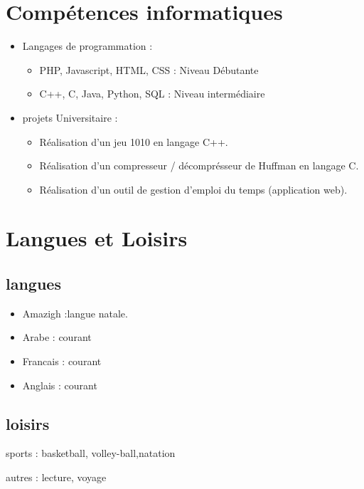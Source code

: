 \documentclass[a4paper]{article}
\begin{document}
\section{Compétences informatiques}
    \begin{itemize}
        \item Langages de programmation :
        \begin{itemize}
            \item PHP, Javascript, HTML, CSS : Niveau Débutante
            \item C++, C, Java, Python, SQL : Niveau intermédiaire 
        \end{itemize}
        
       \item projets Universitaire :
            \begin{itemize}
              \item Réalisation d'un jeu 1010 en langage C++.
              \item Réalisation d'un compresseur / décomprésseur de Huffman en langage C.
              \item Réalisation d'un outil de gestion d'emploi du temps (application web).
        \end{itemize}
    \end{itemize}
\section{Langues et Loisirs}
    \subsection{langues }
    \begin{itemize}
        \item Amazigh :langue natale.
        \item Arabe : courant 
        \item Francais : courant
        \item Anglais : courant
    \end{itemize}
    \subsection{loisirs}
        \item sports : basketball, volley-ball,natation
        \item autres : lecture, voyage  
\end{document}
